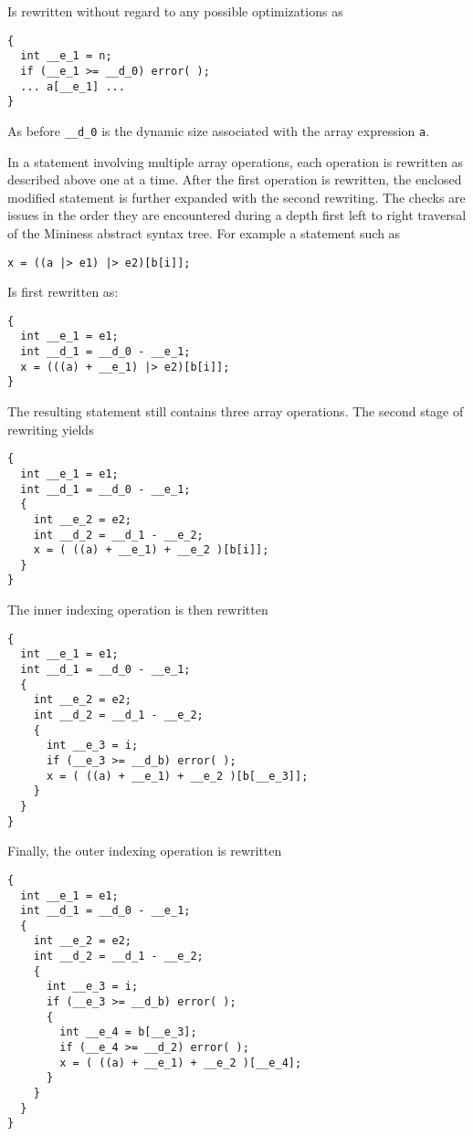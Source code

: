Is rewritten without regard to any possible optimizations as

\singlespace
\begin{Verbatim}
{
  int __e_1 = n;
  if (__e_1 >= __d_0) error( );
  ... a[__e_1] ...
}
\end{Verbatim}
\primaryspacing

As before \texttt{\_\_d\_0} is the dynamic size associated with the array expression \texttt{a}.

In a statement involving multiple array operations, each operation is rewritten as described
above one at a time. After the first operation is rewritten, the enclosed modified statement is
further expanded with the second rewriting. The checks are issues in the order they are
encountered during a depth first left to right traversal of the Mininess abstract syntax tree.
For example a statement such as

\singlespace
\begin{Verbatim}
x = ((a |> e1) |> e2)[b[i]];
\end{Verbatim}
\primaryspacing

Is first rewritten as:

\singlespace
\begin{Verbatim}
{
  int __e_1 = e1;
  int __d_1 = __d_0 - __e_1;
  x = (((a) + __e_1) |> e2)[b[i]];
}
\end{Verbatim}
\primaryspacing

The resulting statement still contains three array operations. The second stage of rewriting
yields

\singlespace
\begin{Verbatim}
{
  int __e_1 = e1;
  int __d_1 = __d_0 - __e_1;
  {
    int __e_2 = e2;
    int __d_2 = __d_1 - __e_2;
    x = ( ((a) + __e_1) + __e_2 )[b[i]];
  }
}
\end{Verbatim}
\primaryspacing

The inner indexing operation is then rewritten

\singlespace
\begin{Verbatim}
{
  int __e_1 = e1;
  int __d_1 = __d_0 - __e_1;
  {
    int __e_2 = e2;
    int __d_2 = __d_1 - __e_2;
    {
      int __e_3 = i;
      if (__e_3 >= __d_b) error( );
      x = ( ((a) + __e_1) + __e_2 )[b[__e_3]];
    }
  }
}
\end{Verbatim}
\primaryspacing

Finally, the outer indexing operation is rewritten

\singlespace
\begin{Verbatim}
{
  int __e_1 = e1;
  int __d_1 = __d_0 - __e_1;
  {
    int __e_2 = e2;
    int __d_2 = __d_1 - __e_2;
    {
      int __e_3 = i;
      if (__e_3 >= __d_b) error( );
      {
        int __e_4 = b[__e_3];
        if (__e_4 >= __d_2) error( );
        x = ( ((a) + __e_1) + __e_2 )[__e_4];
      }
    }
  }
}
\end{Verbatim}
\primaryspacing

